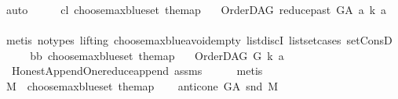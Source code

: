 \begin{isabellebody}
\ auto\isanewline
\ \ \isamarkupfalse%
\ \isamarkupfalse%
\ c{\isacharunderscore}{\kern0pt}l{\isacharcolon}{\kern0pt}\ {\isachardoublequoteopen}choose{\isacharunderscore}{\kern0pt}max{\isacharunderscore}{\kern0pt}blue{\isacharunderscore}{\kern0pt}set\ the{\isacharunderscore}{\kern0pt}map\isanewline
\ \ {\isacharequal}{\kern0pt}\ {\isacharparenleft}{\kern0pt}{\isacharparenleft}{\kern0pt}OrderDAG\ {\isacharparenleft}{\kern0pt}reduce{\isacharunderscore}{\kern0pt}past\ G{\isacharunderscore}{\kern0pt}A\ a{\isacharparenright}{\kern0pt}\ k{\isacharparenright}{\kern0pt}{\isacharcomma}{\kern0pt}\ a{\isacharparenright}{\kern0pt}{\isachardoublequoteclose}\isanewline
\ \ \ \ \isamarkupfalse%
\ {\isacharparenleft}{\kern0pt}metis\ {\isacharparenleft}{\kern0pt}no{\isacharunderscore}{\kern0pt}types{\isacharcomma}{\kern0pt}\ lifting{\isacharparenright}{\kern0pt}\ choose{\isacharunderscore}{\kern0pt}max{\isacharunderscore}{\kern0pt}blue{\isacharunderscore}{\kern0pt}avoid{\isacharunderscore}{\kern0pt}empty\ list{\isachardot}{\kern0pt}discI\ list{\isachardot}{\kern0pt}set{\isacharunderscore}{\kern0pt}cases\ set{\isacharunderscore}{\kern0pt}ConsD{\isacharparenright}{\kern0pt}\isanewline
\ \ \isamarkupfalse%
\ \isamarkupfalse%
\ bb{\isacharcolon}{\kern0pt}\ {\isachardoublequoteopen}choose{\isacharunderscore}{\kern0pt}max{\isacharunderscore}{\kern0pt}blue{\isacharunderscore}{\kern0pt}set\ the{\isacharunderscore}{\kern0pt}map\isanewline
\ \ {\isacharequal}{\kern0pt}\ {\isacharparenleft}{\kern0pt}{\isacharparenleft}{\kern0pt}OrderDAG\ G\ k{\isacharparenright}{\kern0pt}{\isacharcomma}{\kern0pt}\ a{\isacharparenright}{\kern0pt}{\isachardoublequoteclose}\ \isamarkupfalse%
\ \ Honest{\isacharunderscore}{\kern0pt}Append{\isacharunderscore}{\kern0pt}One{\isachardot}{\kern0pt}reduce{\isacharunderscore}{\kern0pt}append\ assms\isanewline
\ \ \ \ \isamarkupfalse%
\ metis\ \isanewline
\ \ \isamarkupfalse%
\ {\isacharquery}{\kern0pt}M\ {\isacharequal}{\kern0pt}\ {\isachardoublequoteopen}choose{\isacharunderscore}{\kern0pt}max{\isacharunderscore}{\kern0pt}blue{\isacharunderscore}{\kern0pt}set\ the{\isacharunderscore}{\kern0pt}map{\isachardoublequoteclose}\isanewline
\ \ \isamarkupfalse%
\ {\isachardoublequoteopen}anticone\ G{\isacharunderscore}{\kern0pt}A\ {\isacharparenleft}{\kern0pt}snd\ {\isacharquery}{\kern0pt}M{\isacharparenright}{\kern0pt}{\isacharequal}{\kern0pt}\ {\isacharbraceleft}{\kern0pt}{\isacharbraceright}{\kern0pt}{\isachardoublequoteclose}\ \isanewline

\end{isabellebody}
